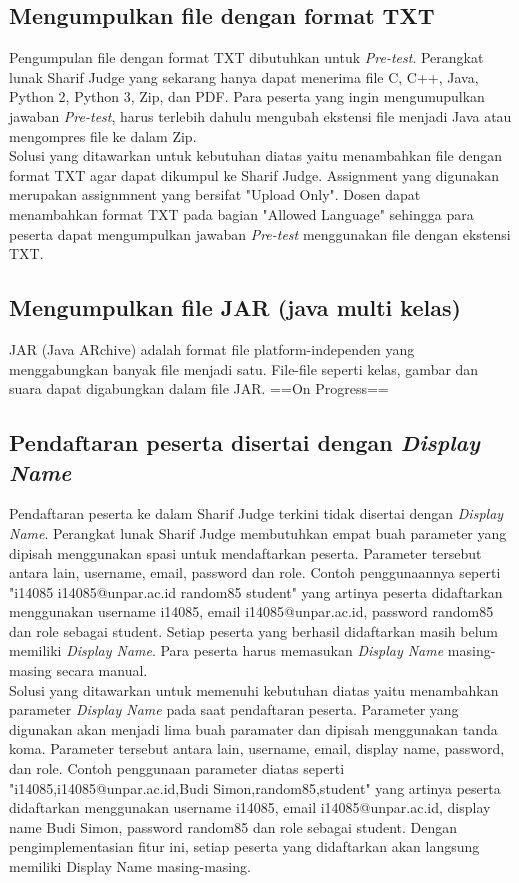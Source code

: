 \subsection{Mengumpulkan file dengan format TXT}
Pengumpulan file dengan format TXT dibutuhkan untuk \textit{Pre-test}. Perangkat lunak Sharif Judge yang sekarang hanya dapat menerima file C, C++, Java, Python 2, Python 3, Zip, dan PDF. Para peserta yang ingin mengumupulkan jawaban \textit{Pre-test}, harus terlebih dahulu mengubah ekstensi file menjadi Java atau mengompres file ke dalam Zip. \\
Solusi yang ditawarkan untuk kebutuhan diatas yaitu menambahkan file dengan format TXT agar dapat dikumpul ke Sharif Judge. Assignment yang digunakan merupakan assignmnent yang bersifat "Upload Only". Dosen dapat menambahkan format TXT pada bagian "Allowed Language" sehingga para peserta dapat mengumpulkan jawaban \textit{Pre-test} menggunakan file dengan ekstensi TXT.


\subsection{Mengumpulkan file JAR (java multi kelas)}
JAR (Java ARchive) adalah format file platform-independen yang menggabungkan banyak file menjadi satu. File-file seperti kelas, gambar dan suara dapat digabungkan dalam file JAR. ==On Progress==

\subsection{Pendaftaran peserta disertai dengan \textit{Display Name}}
Pendaftaran peserta ke dalam Sharif Judge terkini tidak disertai dengan \textit{Display Name}. Perangkat lunak Sharif Judge membutuhkan empat buah parameter yang dipisah menggunakan spasi untuk mendaftarkan peserta. Parameter tersebut antara lain, username, email, password dan role. Contoh penggunaannya seperti "i14085 i14085@unpar.ac.id random85 student" yang artinya peserta didaftarkan menggunakan username i14085, email i14085@unpar.ac.id, password random85 dan role sebagai student. Setiap peserta yang berhasil didaftarkan masih belum memiliki \textit{Display Name}. Para peserta harus memasukan \textit{Display Name} masing-masing secara manual. \\
Solusi yang ditawarkan untuk memenuhi kebutuhan diatas yaitu menambahkan parameter \textit{Display Name} pada saat pendaftaran peserta. Parameter yang digunakan akan menjadi lima buah paramater dan dipisah menggunakan tanda koma. Parameter tersebut antara lain, username, email, display name, password, dan role. Contoh penggunaan parameter diatas seperti "i14085,i14085@unpar.ac.id,Budi Simon,random85,student" yang artinya peserta didaftarkan menggunakan username i14085, email i14085@unpar.ac.id, display name Budi Simon, password random85 dan role sebagai student. Dengan pengimplementasian fitur ini, setiap peserta yang didaftarkan akan langsung memiliki Display Name masing-masing.

